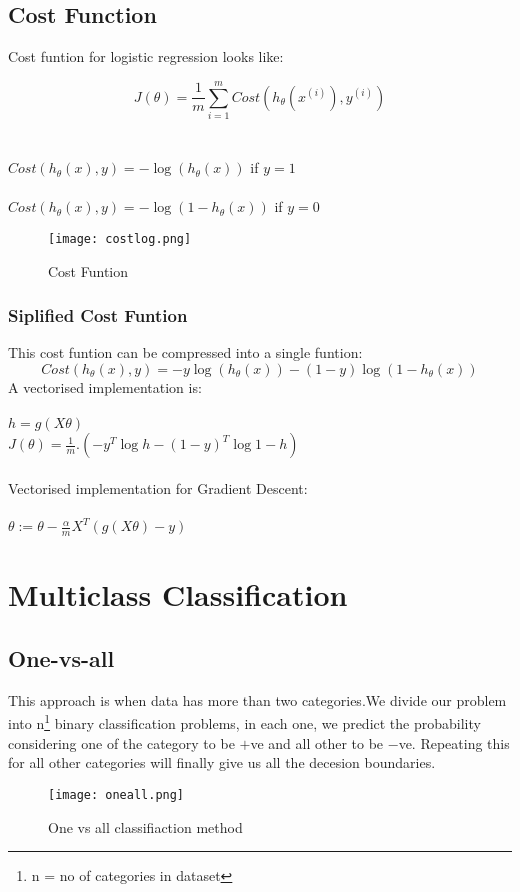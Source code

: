   \subsection{Cost Function}
    Cost funtion for logistic regression looks like:

    \begin{equation}
      J(\theta) = \frac{1}{m}\sum_{i=1}^{m}Cost(h_\theta(x^{(i)}), y^{(i)})
    \end{equation}
    \\ \\
    $ Cost(h_\theta(x),y) = -\log{(h_\theta{(x)})} $ \hfill if $y = 1$
    \\ \\
    $Cost(h_\theta(x),y) = -\log{(1-h_\theta{(x)})}$  \hfill if $y = 0$

    \begin{figure}[h]
      \centering
      \texttt{[image: costlog.png]}
      \caption{Cost Funtion}
    \end{figure}

    \subsubsection{Siplified Cost Funtion}
    This cost funtion can be compressed into a single funtion:
    \begin{equation}
      Cost(h_\theta(x),y) = -y\log{(h_\theta{(x)})} -(1-y)\log{(1-h_\theta{(x)})}
    \end{equation}
    A vectorised implementation is: \\ \\
    $h = g(X\theta)$\\
    $J(\theta) = \frac{1}{m}.(-y^T\log{h}-(1-y)^T\log{1-h})$
    \\ \\
    Vectorised implementation for Gradient Descent: \\ \\
    $\theta := \theta - \frac{\alpha}{m}X^T(g(X\theta)-y)$

\section{Multiclass Classification}
  \subsection{One-vs-all}
    This approach is when data has more than two categories.We divide our problem into n\footnote[1]{n = no of categories in dataset} binary classification problems, in each one, we predict the probability considering one of the category to be $+$ve and all other to be $-$ve. Repeating this for all other categories will finally give us all the decesion boundaries.
    \begin{figure}[h]
      \centering
      \texttt{[image: oneall.png]}
      \caption{One vs all classifiaction method}
    \end{figure}   

